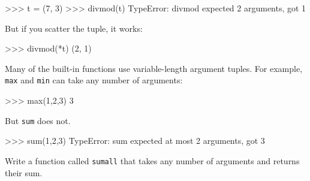 
%



\beforeverb
\begin{pycode}
>>> t = (7, 3)
>>> divmod(t)
TypeError: divmod expected 2 arguments, got 1
\end{pycode}
\afterverb
%
But if you scatter the tuple, it works:

\beforeverb
\begin{pycode}
>>> divmod(*t)
(2, 1)
\end{pycode}
\afterverb
%
\begin{exercise}
Many of the built-in functions use
variable-length argument tuples.  For example, {\tt max}
and {\tt min} can take any number of arguments:


\beforeverb
\begin{pyexo}
>>> max(1,2,3)
3
\end{pyexo}
\afterverb
%
But {\tt sum} does not.


\beforeverb
\begin{pyexo}
>>> sum(1,2,3)
TypeError: sum expected at most 2 arguments, got 3
\end{pyexo}
\afterverb
%
Write a function called {\tt sumall} that takes any number
of arguments and returns their sum.

\end{exercise}

